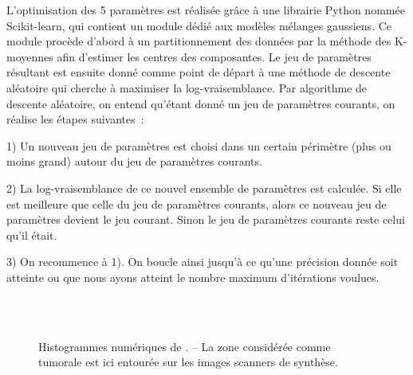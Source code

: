 \documentclass[main.tex]{subfiles}
\begin{document}
L'optimisation des 5 paramètres est réalisée grâce à une librairie Python nommée Scikit-learn, qui contient un module dédié aux modèles mélanges gaussiens. Ce module procède d'abord à un partitionnement %
des données par la méthode des K-moyennes afin d'estimer les centres des composantes. 
Le jeu de paramètres résultant est ensuite donné comme point de départ à une méthode de descente aléatoire qui cherche à maximiser la log-vraisemblance. Par algorithme de descente aléatoire, on entend qu'étant donné un jeu de paramètres courants, on réalise les étapes suivantes~:
\begin{myitemize}
\item[1)] Un nouveau jeu de paramètres est choisi dans un certain périmètre (plus ou moins grand) autour du jeu de paramètres courants.
\item[2)] La log-vraisemblance de ce nouvel ensemble de paramètres est calculée. Si elle est meilleure que celle du jeu de paramètres courants, alors ce nouveau jeu de paramètres devient le jeu courant. Sinon le jeu de paramètres courants reste celui qu'il était.
\item[3)] On recommence à 1). On boucle ainsi jusqu'à ce qu'une précision donnée soit atteinte ou que nous ayons atteint le nombre maximum d'itérations voulues.
\end{myitemize}

\begin{figure}[!b]
\hspace*{-1mm}
\\
\\
\caption{\label{fig:hetero_simu_nber} Histogrammes numériques de \Nber. -- La zone considérée comme tumorale est ici entourée sur les images scanners de synthèse.}
\end{figure}
\end{document}
